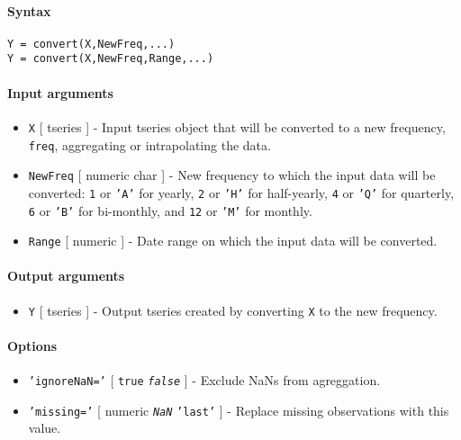 


	\paragraph{Syntax}\label{syntax}

\begin{verbatim}
Y = convert(X,NewFreq,...)
Y = convert(X,NewFreq,Range,...)
\end{verbatim}

\paragraph{Input arguments}\label{input-arguments}

\begin{itemize}
\item
  \texttt{X} {[} tseries {]} - Input tseries object that will be
  converted to a new frequency, \texttt{freq}, aggregating or
  intrapolating the data.
\item
  \texttt{NewFreq} {[} numeric \textbar{} char {]} - New frequency to
  which the input data will be converted: \texttt{1} or \texttt{'A'} for
  yearly, \texttt{2} or \texttt{'H'} for half-yearly, \texttt{4} or
  \texttt{'Q'} for quarterly, \texttt{6} or \texttt{'B'} for bi-monthly,
  and \texttt{12} or \texttt{'M'} for monthly.
\item
  \texttt{Range} {[} numeric {]} - Date range on which the input data
  will be converted.
\end{itemize}

\paragraph{Output arguments}\label{output-arguments}

\begin{itemize}
\itemsep1pt\parskip0pt
\item
  \texttt{Y} {[} tseries {]} - Output tseries created by converting
  \texttt{X} to the new frequency.
\end{itemize}

\paragraph{Options}\label{options}

\begin{itemize}
\item
  \texttt{'ignoreNaN='} {[} \texttt{true} \textbar{}
  \emph{\texttt{false}} {]} - Exclude NaNs from agreggation.
\item
  \texttt{'missing='} {[} numeric \textbar{} \emph{\texttt{NaN}}
  \textbar{} \texttt{'last'} {]} - Replace missing observations with
  this value.
\end{itemize}

